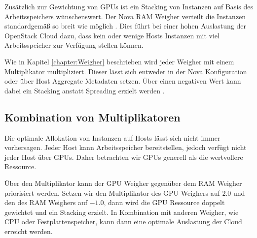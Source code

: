 \documentclass[../Main.tex]{subfiles}
\begin{document}
Zusätzlich zur Gewichtung von GPUs ist ein Stacking von Instanzen auf Basis des Arbeitsspeichers
wünschenswert. Der Nova RAM Weigher verteilt die Instanzen standardgemä{\ss} so breit wie möglich \citep{NormalizedWeights}.
Dies führt bei einer hohen Auslastung der OpenStack Cloud dazu, dass kein oder wenige Hosts Instanzen
mit viel Arbeitsspeicher zur Verfügung stellen können.

Wie in Kapitel \ref{chapter:Weigher} beschrieben wird jeder Weigher mit einem Multiplikator multipliziert. Dieser
lässt sich entweder in der Nova Konfiguration oder über Host Aggregate Metadaten setzen.
Über einen negativen Wert kann dabei ein Stacking anstatt Spreading erzielt werden \citep{ComputeSchedulers}.

\subsection{Kombination von Multiplikatoren}

Die optimale Allokation von Instanzen auf Hosts lässt sich nicht immer vorhersagen.
Jeder Host kann Arbeitsspeicher bereitstellen, jedoch verfügt nicht jeder Host über GPUs.
Daher betrachten wir GPUs generell als die \glqq wertvollere\grqq{} Ressource.

Über den Multiplikator kann der GPU Weigher gegenüber dem RAM Weigher priorisiert werden. Setzen wir
den Multiplikator des GPU Weighers auf $2.0$ und den des RAM Weighers auf $-1.0$, dann wird
die GPU Ressource doppelt gewichtet und ein Stacking erzielt. In Kombination mit anderen Weigher, wie CPU oder Festplattenspeicher,
kann dann eine optimale Auslastung der Cloud erreicht werden.

\biblio %
\end{document}
